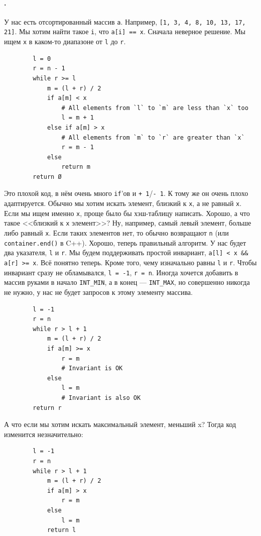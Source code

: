 \documentclass{article}
\newcommand{\pseudo}{PseudoLexer.py:PseudoLexer -x}
\newcommand{\pseudocode}[1]{\texttt{#1}}
\begin{document}
    \paragraph{.}
    У нас есть отсортированный массив \pseudocode{a}. Например, \pseudocode{[1, 3, 4, 8, 10, 13, 17, 21]}. Мы хотим найти такое \pseudocode{i}, что \pseudocode{a[i] == x}. Сначала неверное решение. Мы ищем \pseudocode{x} в каком-то диапазоне от \pseudocode{l} до \pseudocode{r}.
    \begin{verbatim}
        l = 0
        r = n - 1
        while r >= l
            m = (l + r) / 2
            if a[m] < x
                # All elements from `l` to `m` are less than `x` too
                l = m + 1
            else if a[m] > x
                # All elements from `m` to `r` are greater than `x`
                r = m - 1
            else
                return m
        return Ø
    \end{verbatim}
    Это плохой код, в нём очень много \pseudocode{if}'ов и \pseudocode{+ 1}/\pseudocode{- 1}. К тому же он очень плохо адаптируется. Обычно мы хотим искать элемент, близкий к \pseudocode{x}, а не равный \pseudocode{x}. Если мы ищем именно \pseudocode{x}, проще было бы хэш-таблицу написать. Хорошо, а что такое <<близкий к \pseudocode{x} элемент>>? Ну, например, самый левый элемент, больше либо равный \pseudocode{x}. Если таких элементов нет, то обычно возвращают \pseudocode{n} (или \texttt{container.end()} в C++). Хорошо, теперь правильный алгоритм. У нас будет два указателя, \pseudocode{l} и \pseudocode{r}. Мы будем поддерживать простой инвариант, \pseudocode{a[l] < x && a[r] >= x}. Всё понятно теперь. Кроме того, чему изначально равны \pseudocode{l} и \pseudocode{r}. Чтобы инвариант сразу не обламывался, \pseudocode{l = -1}, \pseudocode{r = n}. Иногда хочется добавить в массив руками в начало \texttt{INT_MIN}, а в конец --- \texttt{INT_MAX}, но совершенно никогда не нужно, у нас не будет запросов к этому элементу массива.
    \begin{verbatim}
        l = -1
        r = n
        while r > l + 1
            m = (l + r) / 2
            if a[m] >= x
                r = m
                # Invariant is OK
            else
                l = m
                # Invariant is also OK
        return r
    \end{verbatim}
    А что если мы хотим искать максимальный элемент, меньший x? Тогда код изменится незначительно:
    \begin{verbatim}
        l = -1
        r = n
        while r > l + 1
            m = (l + r) / 2
            if a[m] > x
                r = m
            else
                l = m
            return l
    \end{verbatim}
\end{document}
